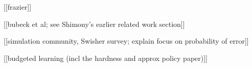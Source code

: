 [[frazier]]

[[bubeck et al; see Shimony's earlier related work section]]

[[simulation community, Swisher survey; explain focus on probability of error]]

[[budgeted learning (incl the hardness and approx policy paper)]]
